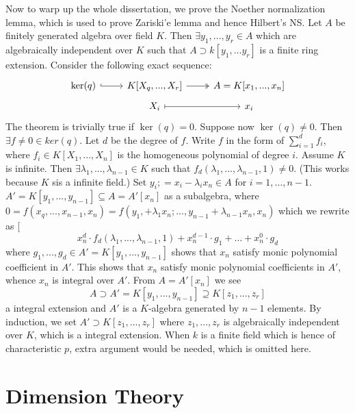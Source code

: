 \documentclass[12pt]{article}
\theoremstyle{definition}
\theoremstyle{plain}
\begin{document}
\bigskip
Now to warp up the whole dissertation, we prove the Noether normalization lemma, which is used to prove Zariski'e lemma and hence Hilbert's NS.
 Let $A$ be finitely generated algebra over field $K$. Then $\exists y_1, ..., y_r\in A$ which are algebraically independent over $K$ such that $A\supset k[y_1, ...y_r]$ is a finite ring extension.
\proof Consider the following exact sequence:
\begin{equation}
  \begin{tikzcd}[row sep=tiny]
  \ker(q)\rar[hook] &K[X_q,...,X_r]\rar[two heads]&A=K[x_1,...,x_n]\\
  &X_i\rar[|->]&x_i
  \end{tikzcd}
\end{equation}
The theorem is trivially true if $\ker(q)=0$. Suppose now $\ker(q)\neq 0$. Then $\exists f\neq 0\in ker(q)$. Let $d$ be the degree of $f$. Write $f$ in the form of $\sum_{i=1}^d f_i$, where $f_i\in K[X_1, ..., X_n]$ is the homogeneous polynomial of degree $i$. Assume $K$ is infinite. Then $\exists \lambda_1, ..., \lambda_{n-1}\in K$ such that $f_d(\lambda_1, ..., \lambda_{n-1}, 1)\neq 0$. (This works because $K$ sis a infinite field.) Set $y_i;=x_i-\lambda_ix_n\in A$ for $i=1, ..., n-1$. $A'=K[y_1, ..., y_{n-1}]\subseteq A=A'[x_n]$ as a subalgebra, where $0=f(x_q, ...,x_{n-1}, x_n)=f(y_1,+\lambda_1x_n;  ..., y_{n-1}+\lambda_{n-1}x_n, x_n)$ which we rewrite as
[\[x_n^d\cdot f_d(\lambda_1, ..., \lambda_{n-1}, 1)+x_n^{d-1}\cdot g_1+...+x_n^0\cdot g_d\]
where $g_1, ..., g_d\in A'=K[y_1, ..., y_{n-1}]$ shows that $x_n$ satisfy monic polynomial coefficient in $A'$. This shows that $x_n$ satisfy monic polynomial coefficients in $A'$, whence $x_n$ is integral over $A'$. From $A=A'[x_n]$ we see
\[A\supset A'=K[y_1, ..., y_{n-1}]\supseteq K[z_1, ..., z_r]\]
a integral extension and $A'$ is a $K$-algebra generated by $n-1$ elements. By induction, we set $A'\supset K[z_1,...,z_r]$ where $z_1, ..., z_r$ is algebraically independent over $K$, which is a integral extension.
\Rmk When $k$ is a finite field which is hence of characteristic $p$, extra argument would be needed, which is omitted here.

\section{Dimension Theory}
\end{document}

